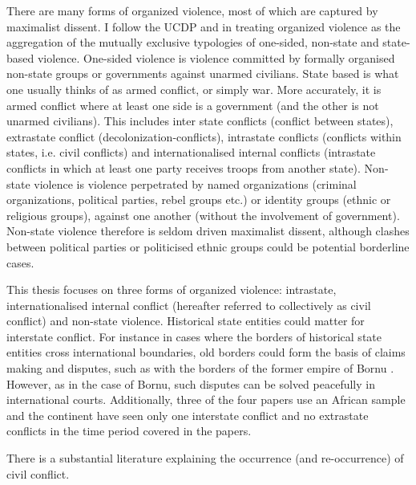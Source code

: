 \documentclass[12pt]{article}
\begin{document}
There are many forms of organized violence, most of which are captured by
maximalist dissent. I follow the UCDP and \citet{Melander_2016} in treating
organized violence as the aggregation of the mutually exclusive typologies of
one-sided, non-state and state-based violence. One-sided violence is violence
committed by formally organised non-state groups or governments against unarmed
civilians. State based is what one usually thinks of as armed conflict, or
simply war. More accurately, it is armed conflict where at least one side is a
government (and the other is not unarmed civilians). This includes inter state
conflicts (conflict between states), extrastate conflict
(decolonization-conflicts), intrastate conflicts (conflicts within states, i.e.
civil conflicts) and internationalised internal conflicts (intrastate conflicts
in which at least one party receives troops from another state). Non-state
violence is violence perpetrated by named organizations (criminal organizations,
political parties, rebel groups etc.) or identity groups (ethnic or religious
groups), against one another (without the involvement of government). Non-state
violence therefore is seldom driven maximalist dissent, although clashes between
political parties or politicised ethnic groups could be potential borderline
cases.

This thesis focuses on three forms of organized violence: intrastate,
internationalised internal conflict (hereafter referred to collectively as civil
conflict) and non-state violence. Historical state entities could matter for
interstate conflict. For instance in cases where the borders of historical state
entities cross international boundaries, old borders could form the basis of
claims making and disputes, such as with the borders of the former empire of
Bornu \citep{Hariri2012}. However, as in the case of Bornu, such disputes can be
solved peacefully in international courts. Additionally, three of the four
papers use an African sample and the continent have seen only one interstate
conflict and no extrastate conflicts in the time period covered in the papers.

There is a substantial literature explaining the occurrence (and re-occurrence) of civil conflict. 
\end{document}
